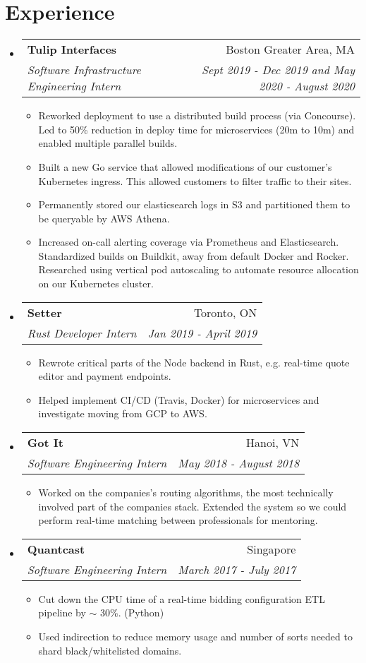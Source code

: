 \documentclass[letterpaper,11pt]{article}
\makeatletter
\newcommand{\resumeSubheading}[4]{
  \vspace{-1pt}\item
    \begin{tabular*}{0.97\textwidth}{l@{\extracolsep{\fill}}r}
      \textbf{#1} & #2 \\
      \textit{\small#3} & \textit{\small #4} \\
    \end{tabular*}\vspace{-5pt}
}
\newcommand{\resumeSubHeadingListStart}{\begin{itemize}[leftmargin=*, label={}]}
\newcommand{\resumeSubHeadingListEnd}{\end{itemize}}
\makeatother
\begin{document}
\section{Experience}
  \resumeSubHeadingListStart
  \resumeSubheading
    {Tulip Interfaces}{Boston Greater Area, MA}
    {Software Infrastructure Engineering Intern}{Sept 2019 - Dec 2019 and May 2020 - August 2020}
        \begin{itemize}[label={\textbullet}]
          \item Reworked deployment to use a distributed build process (via Concourse).
            Led to 50\% reduction in deploy time for microservices (20m to 10m) and enabled multiple parallel builds.
          \item Built a new Go service that allowed modifications of our customer's Kubernetes
            ingress. This allowed customers to filter traffic to their sites.
          \item Permanently stored our elasticsearch logs in S3 and partitioned them to be
            queryable by AWS Athena.
          \item Increased on-call alerting coverage via Prometheus and Elasticsearch.
            Standardized builds on Buildkit, away from default Docker and Rocker.
            Researched using vertical pod autoscaling to automate resource allocation on our
            Kubernetes cluster.
        \end{itemize}
    \resumeSubheading
      {Setter}{Toronto, ON}
      {Rust Developer Intern}{Jan 2019 - April 2019}
          \begin{itemize}[label={\textbullet}]
              \item Rewrote critical parts of the Node backend in Rust, e.g. real-time quote editor and payment endpoints.
              \item Helped implement CI/CD (Travis, Docker) for microservices and investigate
                  moving from GCP to AWS.
          \end{itemize}
     \resumeSubheading
      {Got It}{Hanoi, VN}
      {Software Engineering Intern}{May 2018 - August 2018}
          \begin{itemize}[label={\textbullet}]
              \item Worked on the companies's routing algorithms, the most
                  technically involved part of the companies stack. Extended the
                  system so we could perform real-time matching between professionals for
                  mentoring.
          \end{itemize}
    \resumeSubheading
      {Quantcast}{Singapore}
      {Software Engineering Intern}{March 2017 - July 2017}
      \begin{itemize}[label={\textbullet}]
        \item Cut down the CPU time of a real-time bidding configuration ETL pipeline by
          \(\sim\) 30\%. (Python)
        \item Used indirection to reduce memory usage and number of sorts
          needed to shard black/whitelisted domains.
      \end{itemize}
  \resumeSubHeadingListEnd
\end{document}
